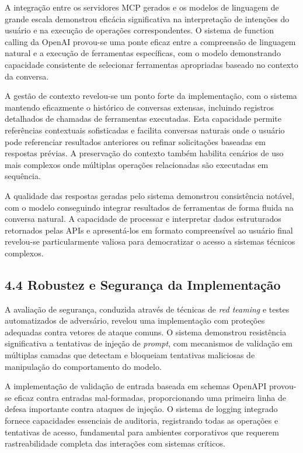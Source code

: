 \documentclass[
]{article}
\begin{document}
A integração entre os servidores MCP gerados e os modelos de linguagem
de grande escala demonstrou eficácia significativa na interpretação de
intenções do usuário e na execução de operações correspondentes. O
sistema de function calling da OpenAI provou-se uma ponte eficaz entre a
compreensão de linguagem natural e a execução de ferramentas
específicas, com o modelo demonstrando capacidade consistente de
selecionar ferramentas apropriadas baseado no contexto da conversa.

A gestão de contexto revelou-se um ponto forte da implementação, com o
sistema mantendo eficazmente o histórico de conversas extensas,
incluindo registros detalhados de chamadas de ferramentas executadas.
Esta capacidade permite referências contextuais sofisticadas e facilita
conversas naturais onde o usuário pode referenciar resultados anteriores
ou refinar solicitações baseadas em respostas prévias. A preservação do
contexto também habilita cenários de uso mais complexos onde múltiplas
operações relacionadas são executadas em sequência.

A qualidade das respostas geradas pelo sistema demonstrou consistência
notável, com o modelo conseguindo integrar resultados de ferramentas de
forma fluida na conversa natural. A capacidade de processar e
interpretar dados estruturados retornados pelas APIs e apresentá-los em
formato compreensível ao usuário final revelou-se particularmente
valiosa para democratizar o acesso a sistemas técnicos complexos.

\subsection{4.4 Robustez e Segurança da
Implementação}\label{robustez-e-seguranuxe7a-da-implementauxe7uxe3o}

A avaliação de segurança, conduzida através de técnicas de \emph{red
teaming} e testes automatizados de adversário, revelou uma implementação
com proteções adequadas contra vetores de ataque comuns. O sistema
demonstrou resistência significativa a tentativas de injeção de
\emph{prompt}, com mecanismos de validação em múltiplas camadas que
detectam e bloqueiam tentativas maliciosas de manipulação do
comportamento do modelo.

A implementação de validação de entrada baseada em schemas OpenAPI
provou-se eficaz contra entradas mal-formadas, proporcionando uma
primeira linha de defesa importante contra ataques de injeção. O sistema
de logging integrado fornece capacidades essenciais de auditoria,
registrando todas as operações e tentativas de acesso, fundamental para
ambientes corporativos que requerem rastreabilidade completa das
interações com sistemas críticos.
\end{document}
